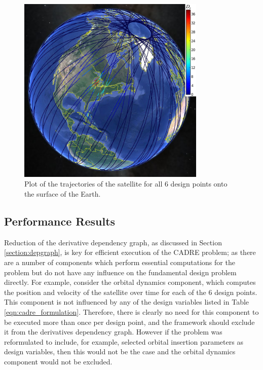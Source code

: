 \documentclass[]{aiaa-tc} %
\begin{document}
        \begin{figure}
        \centering
        \includegraphics[width=0.8\textwidth]{images/allpts_gearth2}
        \caption[width=0.4\textwidth]{Plot of the trajectories of the satellite
        for all 6 design points onto the surface of the Earth.
        \label{allpt_g_earth}
        }

        \end{figure}

        \subsection{Performance Results}

            Reduction of the derivative dependency graph, as discussed in
            Section \ref{section:depgraph}, is key for efficient execution
            of the CADRE problem; as there are a number of components which
            perform essential computations for the problem but do not have any influence
            on the fundamental design problem directly. For example, consider the orbital
            dynamics component, which computes the position and velocity of the satellite over
            time for each of the 6 design points. This component is not
            influenced by any of the design variables listed in Table \ref{eqn:cadre_formulation}. Therefore,
            there is clearly no need for this component to be executed more than once
            per design point, and the framework should exclude it from the
            derivatives dependency graph. However if the problem was
            reformulated to include, for example, selected orbital insertion parameters as
            design variables, then this would not be the case and the orbital
            dynamics component would not be excluded.
\end{document}
